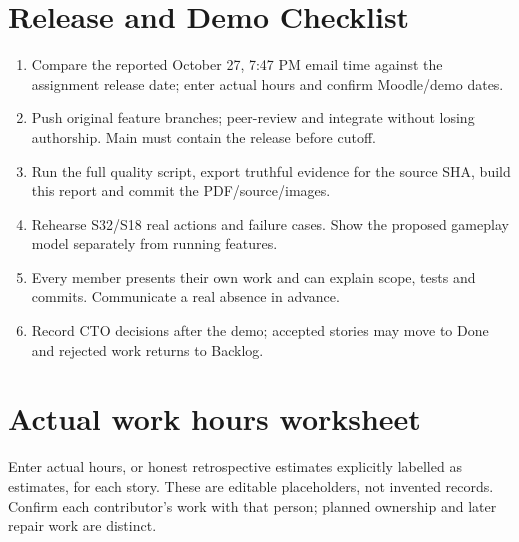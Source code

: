 \documentclass[11pt,a4paper]{article}
\begin{document}
\section{Release and Demo Checklist}
\begin{enumerate}\setlength{\itemsep}{1pt}\setlength{\parsep}{0pt}
\item Compare the reported October 27, 7:47 PM email time against the assignment release date; enter actual hours and confirm Moodle/demo dates.
\item Push original feature branches; peer-review and integrate without losing authorship. Main must contain the release before cutoff.
\item Run the full quality script, export truthful evidence for the source SHA, build this report and commit the PDF/source/images.
\item Rehearse S32/S18 real actions and failure cases. Show the proposed gameplay model separately from running features.
\item Every member presents their own work and can explain scope, tests and commits. Communicate a real absence in advance.
\item Record CTO decisions after the demo; accepted stories may move to Done and rejected work returns to Backlog.
\end{enumerate}


\clearpage
\appendix
\section{Actual work hours worksheet}
Enter actual hours, or honest retrospective estimates explicitly labelled as estimates, for each story. These are editable placeholders, not invented records. Confirm each contributor's work with that person; planned ownership and later repair work are distinct.
\end{document}
